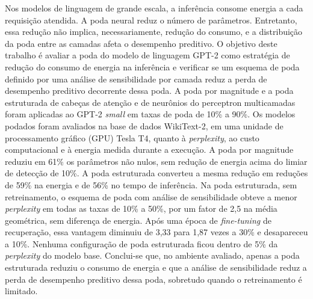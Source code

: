 \begin{resumo}
Nos modelos de linguagem de grande escala, a inferência consome energia a cada requisição
atendida. A poda neural reduz o número de parâmetros. Entretanto, essa redução não implica,
necessariamente, redução do consumo, e a distribuição da poda entre as camadas afeta o
desempenho preditivo. O objetivo deste trabalho é avaliar a poda do modelo de linguagem \mbox{GPT-2}
como estratégia de redução do consumo de energia na inferência e verificar se um esquema de
poda definido por uma análise de sensibilidade por camada reduz a perda de desempenho
preditivo decorrente dessa poda. A poda por magnitude e a poda estruturada de cabeças de
atenção e de neurônios do perceptron multicamadas foram aplicadas ao \mbox{GPT-2} \textit{small} em
taxas de poda de 10\% a 90\%. Os modelos podados foram avaliados na base de dados \mbox{WikiText-2},
em uma unidade de processamento gráfico (GPU) Tesla T4, quanto à \textit{perplexity}, ao custo computacional e à energia medida
durante a execução. A poda por magnitude reduziu em 61\% os parâmetros não nulos, sem redução
de energia acima do limiar de detecção de 10\%. A poda estruturada converteu a mesma redução
em reduções de 59\% na energia e de 56\% no tempo de inferência. Na poda estruturada, sem retreinamento, o
esquema de poda com análise de sensibilidade obteve a menor \textit{perplexity} em todas as
taxas de 10\% a 50\%, por um fator de 2,5 na média geométrica, sem diferença de energia. Após
uma época de \textit{fine-tuning} de recuperação, essa vantagem diminuiu de 3,33 para 1,87
vezes a 30\% e desapareceu a 10\%. Nenhuma configuração de poda estruturada ficou dentro de
5\% da \textit{perplexity} do modelo base. Conclui-se que, no ambiente avaliado, apenas a poda
estruturada reduziu o consumo de energia e que a análise de sensibilidade reduz a perda de
desempenho preditivo dessa poda, sobretudo quando o retreinamento é limitado.

\vspace{\onelineskip}
\end{resumo}
\folhaembranco


